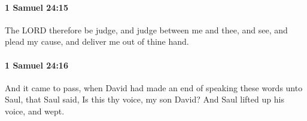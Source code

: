 		\paragraph{1 Samuel 24:15} %
			\label{1SAMUEL-24-15}

			The LORD therefore be judge, and judge between me and thee, and see, and plead my cause, and deliver me out of thine hand.


		\paragraph{1 Samuel 24:16} %
			\label{1SAMUEL-24-16}

			And it came to pass, when David had made an end of speaking these words unto Saul, that Saul said, Is this thy voice, my son David? And Saul lifted up his voice, and wept.


